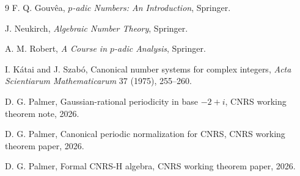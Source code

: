 \documentclass[11pt]{article}
\begin{document}
\begin{thebibliography}{9}
F. Q. Gouv\^ea,
\emph{$p$-adic Numbers: An Introduction},
Springer.

J. Neukirch,
\emph{Algebraic Number Theory},
Springer.

A. M. Robert,
\emph{A Course in $p$-adic Analysis},
Springer.

I. K\'atai and J. Szab\'o,
Canonical number systems for complex integers,
\emph{Acta Scientiarum Mathematicarum} 37 (1975), 255--260.

D. G. Palmer,
Gaussian-rational periodicity in base $-2+i$,
CNRS working theorem note, 2026.

D. G. Palmer,
Canonical periodic normalization for CNRS,
CNRS working theorem paper, 2026.

D. G. Palmer,
Formal CNRS-H algebra,
CNRS working theorem paper, 2026.
\end{thebibliography}
\end{document}
